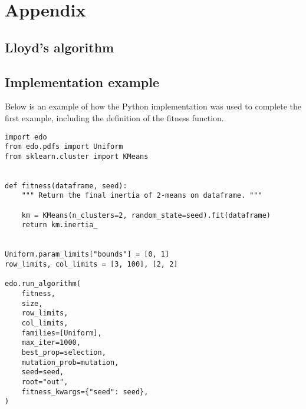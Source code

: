 \appendix
\section{Appendix}

\subsection{Lloyd's algorithm}\label{appendix:kmeans}



\subsection{Implementation example}\label{appendix:code}

Below is an example of how the Python implementation was used to complete the
first example, including the definition of the fitness function.

\singlespacing\begin{verbatim}
import edo
from edo.pdfs import Uniform
from sklearn.cluster import KMeans


def fitness(dataframe, seed):
    """ Return the final inertia of 2-means on dataframe. """

    km = KMeans(n_clusters=2, random_state=seed).fit(dataframe)
    return km.inertia_


Uniform.param_limits["bounds"] = [0, 1]
row_limits, col_limits = [3, 100], [2, 2]

edo.run_algorithm(
    fitness,
    size,
    row_limits,
    col_limits,
    families=[Uniform],
    max_iter=1000,
    best_prop=selection,
    mutation_prob=mutation,
    seed=seed,
    root="out",
    fitness_kwargs={"seed": seed},
)
\end{verbatim}
